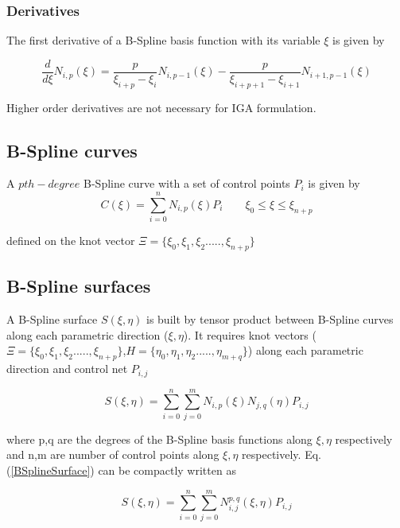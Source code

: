 \documentclass[12pt]{article}
\begin{document}
\subsubsection{Derivatives }
The first derivative of a B-Spline basis function with its variable $\xi$ is given by

\begin{equation}
\frac{d}{d\xi}N_{i,p}(\xi) = \frac{p}{\xi_{i+p}-\xi_{i}} N_{i,p-1}(\xi) -
\frac{p}{\xi_{i+p+1}-\xi_{i+1}} N_{i+1,p-1}(\xi)
\end{equation}

\noindent
Higher order derivatives are not necessary for IGA formulation.

\subsection{B-Spline curves}

A $pth-degree$ B-Spline curve with a set of control points $P_i$ is given by
\begin{equation}
C(\xi) = \sum_{i=0}^{n} N_{i,p}(\xi) P_i \qquad \xi_0 \leq \xi \leq \xi_{n+p}
\end{equation}

\noindent
defined on the knot vector $\Xi = \{ \xi_0,\xi_1,\xi_2.....,\xi_{n+p}\}$

\subsection{B-Spline surfaces}
A B-Spline surface $S(\xi,\eta)$ is built by tensor product between B-Spline curves along each parametric direction ($\xi,\eta$). It requires knot vectors ($\Xi = \{ \xi_0,\xi_1,\xi_2.....,\xi_{n+p}\}$,$H = \{\eta_0,\eta_1,\eta_2.....,\eta_{m+q}\}$) along each parametric direction and control net $P_{i,j}$


\begin{equation} \label{BSplineSurface}
S(\xi,\eta) = \sum_{i=0}^{n}\sum_{j=0}^{m} N_{i,p}(\xi) N_{j,q}(\eta) P_{i,j}
\end{equation}

\noindent
where
p,q are the degrees of the B-Spline basis functions along $\xi,\eta$ respectively and n,m are number of control points along $\xi,\eta$ respectively.
\noindent
Eq. (\ref{BSplineSurface}) can be compactly written as

\begin{equation} \label{BSplineSurface}
S(\xi,\eta) = \sum_{i=0}^{n}\sum_{j=0}^{m} N_{i,j}^{p,q}(\xi,\eta) P_{i,j}
\end{equation}
\end{document}
